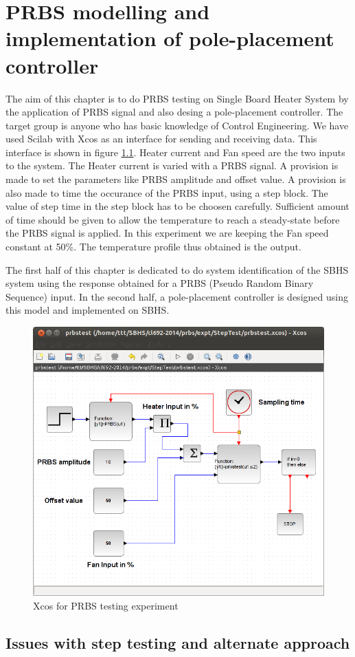 \chapter{PRBS modelling and implementation of pole-placement controller}
The aim of this chapter is to do PRBS testing on Single Board Heater System by the application of PRBS signal and also desing a pole-placement controller. The target group is anyone who has basic knowledge of Control Engineering. We have used Scilab with Xcos as an interface for sending and receiving data. This interface is shown in figure \ref{prbs-xcos}. Heater current and Fan speed are the two inputs to the system. The Heater current is varied with a PRBS signal. A provision is made to set the parameters like PRBS amplitude and offset value. A provision is also made to time the occurance of the PRBS input, using a step block. The value of step time in the step block has to be choosen carefully. Sufficient amount of time should be given to allow the temperature to reach a steady-state before the PRBS signal is applied. In this experiment we are keeping the Fan speed constant at 50\%. The temperature profile thus obtained is the output.

The first half of this chapter is dedicated to do system identification of the SBHS system using the response obtained for a PRBS (Pseudo Random Binary Sequence) input. In the second half, a pole-placement controller is designed using this model and implemented on SBHS.
\begin{figure}
\centering
\includegraphics[width=0.7\linewidth]{prbs/prbs-xcos.png}
\caption{Xcos for PRBS testing experiment}
\label{prbs-xcos}
\end{figure}

\section{Issues with step testing and alternate approach}

